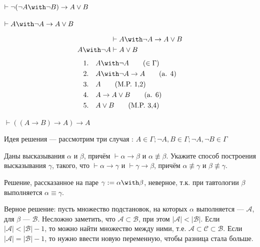 \begin{exercise}[4.c]
    \(\vdash \neg (\neg A \with \neg B) \to A \lor B\)
\end{exercise}

\begin{exercise}[4.d]
    \(\vdash A \with \neg A \to A \lor B\)

    \begin{align*}
                       & \vdash A \with \neg A \to A \lor B \\
        A \with \neg A & \vdash A \lor B
    \end{align*}
    \begin{align*}
        1.\quad & A \with \neg A \tag{\(\in\Gamma\)} \\
        2.\quad & A \with \neg A \to A \tag{a. 4}    \\
        3.\quad & A \tag{M.P. 1,2}                   \\
        4.\quad & A \to A \lor B \tag{a. 6}          \\
        5.\quad & A \lor B \tag{M.P. 3,4}            \\
    \end{align*}
\end{exercise}

\begin{exercise}[4.e]
    \(\vdash ((A \to B) \to A) \to A\)

    Идея решения --- рассмотрим три случая : \(A \in \Gamma; \neg A, B \in \Gamma; \neg A, \neg B \in \Gamma\)
\end{exercise}

\begin{exercise}[5]
    Даны высказывания $\alpha$ и $\beta$, причём $\vdash \alpha\rightarrow\beta$ и $\alpha\not\equiv\beta$.
    Укажите способ построения высказывания $\gamma$, такого, что
    $\vdash\alpha\rightarrow\gamma$ и $\vdash\gamma\rightarrow\beta$, причём $\alpha\not\equiv\gamma$ и
    $\beta\not\equiv\gamma$.

    Решение, рассказанное на паре \(\gamma : = \alpha \with \beta\), неверное, т.к. при тавтологии \(\beta\) выполняется \(\alpha \equiv \gamma\).

    Верное решение: пусть множество подстановок, на которых \(\alpha\) выполняется --- \(\mathcal{A}\), для \(\beta\) --- \(\mathcal{B}\). Несложно заметить, что \(\mathcal{A}\subset \mathcal{B}\), при этом \(|\mathcal{A}| < |\mathcal{B}|\). Если \(|\mathcal{A}| < |\mathcal{B}| - 1\), то можно найти множество между ними, т.е. \(\mathcal{A}\subset \mathcal{C}\subset \mathcal{B}\). Если \(|\mathcal{A}| = |\mathcal{B}| - 1\), то нужно ввести новую переменную, чтобы разница стала больше.
\end{exercise}

